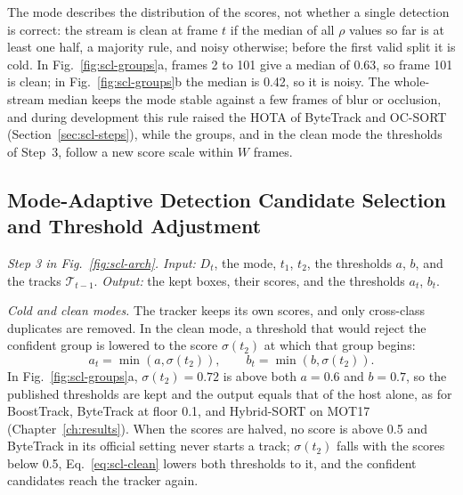 The mode describes the distribution of the scores, not whether a single detection is correct: the stream is clean at frame $t$ if the median of all $\rho$ values so far is at least one half, a majority rule, and noisy otherwise; before the first valid split it is cold. In Fig.~\ref{fig:scl-groups}a, frames 2 to 101 give a median of 0.63, so frame 101 is clean; in Fig.~\ref{fig:scl-groups}b the median is 0.42, so it is noisy. The whole-stream median keeps the mode stable against a few frames of blur or occlusion, and during development this rule raised the HOTA of ByteTrack and OC-SORT (Section~\ref{sec:scl-steps}), while the groups, and in the clean mode the thresholds of Step~3, follow a new score scale within $W$ frames.

\subsection{Mode-Adaptive Detection Candidate Selection and Threshold Adjustment}\label{sec:scl-modes}
\emph{Step 3 in Fig.~\ref{fig:scl-arch}. Input:} $D_t$, the mode, $t_1$, $t_2$, the thresholds $a$, $b$, and the tracks $\mathcal{T}_{t-1}$. \emph{Output:} the kept boxes, their scores, and the thresholds $a_t$, $b_t$.

\emph{Cold and clean modes.} The tracker keeps its own scores, and only cross-class duplicates are removed. In the clean mode, a threshold that would reject the confident group is lowered to the score $\sigma(t_2)$ at which that group begins:
\begin{equation}
a_t=\min\!\left(a,\sigma(t_2)\right),\qquad b_t=\min\!\left(b,\sigma(t_2)\right).
\label{eq:scl-clean}
\end{equation}
In Fig.~\ref{fig:scl-groups}a, $\sigma(t_2)=0.72$ is above both $a=0.6$ and $b=0.7$, so the published thresholds are kept and the output equals that of the host alone, as for BoostTrack, ByteTrack at floor 0.1, and Hybrid-SORT on MOT17 (Chapter~\ref{ch:results}). When the scores are halved, no score is above 0.5 and ByteTrack in its official setting never starts a track; $\sigma(t_2)$ falls with the scores below 0.5, Eq.~\eqref{eq:scl-clean} lowers both thresholds to it, and the confident candidates reach the tracker again.

